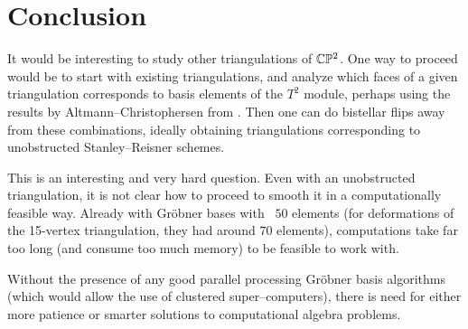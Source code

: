 \section{Conclusion}

It would be interesting to study other triangulations of $\mathbb{C} \mathbb{P}^2$. One way to proceed would be to start with existing triangulations, and analyze which faces of a given triangulation corresponds to basis elements of the $T^2$ module, perhaps using the results by Altmann--Christophersen from \cite{deforming_christophersen}. Then one can do bistellar flips away from these combinations, ideally obtaining triangulations corresponding to unobstructed Stanley--Reisner schemes.

This is an interesting and very hard question. Even with an unobstructed triangulation, it is not clear how to proceed to smooth it in a computationally feasible way. Already with Gröbner bases with ~$50$ elements (for deformations of the 15-vertex triangulation, they had around $70$ elements), computations take far too long (and consume too much memory) to be feasible to work with.

Without the presence of any good parallel processing Gröbner basis algorithms (which would allow the use of clustered super--computers), there is need for either more patience or smarter solutions to computational algebra problems.